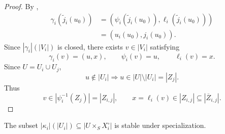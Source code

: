 \begin{proof}
  By ,
  \[
  \begin{aligned}
    \gamma_i(\widetilde j_i(u_0))
      &=(\psi_i(\widetilde j_i(u_0)),
          \ell_i(\widetilde j_i(u_0)))\\
      &=(u_i(u_0),j_i(u_0)).
  \end{aligned}
  \]
  Since $|\gamma_i|(|V_i|)$ is closed, there exists $v\in|V_i|$ satisfying
  \[
    \gamma_i(v)=(u,x),\qquad
    \psi_i(v)=u,\qquad \ell_i(v)=x.                               \tag{31}
  \]
  Since $U=U_i\cup U_j$,
  \[
    u\notin|U_i|\Longrightarrow u\in|U|\setminus|U_i|=|Z_j|.
  \]
  Thus
  \[
    v\in|\psi_i^{-1}(Z_j)|=|Z_{i,j}|,
    \qquad
    x=\ell_i(v)\in|Z_{i,j}|\subseteq|\overline Z_{i,j}|.
  \]
\end{proof}

\begin{lemma}
  \label{lemma:nagata-intermediate-overlap-specialization-closed}

  The subset
  $|\kappa_i|(|U_i|)\subseteq|U\times_SX_i^\circ|$ is stable under
  specialization.
\end{lemma}

